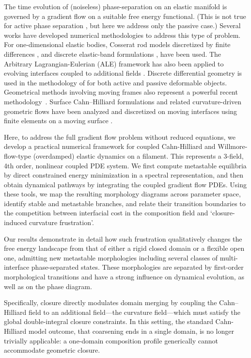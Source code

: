 \documentclass[
aip,
jcp,
reprint, 
floatfix
]{revtex4-1}
\begin{document}
The time evolution of (noiseless) phase-separation on an elastic manifold is governed by a gradient flow on a suitable free energy functional. (This is not true for active phase separation \cite{Cates_2025}, but here we address only the passive case.) Several works have developed numerical methodologies to address this type of problem. For one-dimensional elastic bodies, Cosserat rod models discretized by finite differences \cite{PyElastica}, and discrete elastic-band formulations \cite{Bergou2008discrete}, have been used. The Arbitrary Lagrangian-Eulerian (ALE) framework has also been applied to evolving interfaces coupled to additional fields \cite{membranes15040106}. Discrete differential geometry is used in the methodology of \cite{choi2024dismech} for both active and passive deformable objects. Geometrical methods involving moving frames also represent a powerful recent methodology~\cite{kikuchi2024rare,nemeth2024geometric}. Surface Cahn--Hilliard formulations and related curvature-driven geometric flows have been analyzed and discretized on moving interfaces using finite elements on a moving surface \cite{elliott2010surface, elliott2021domain}. 

Here, to address the full gradient flow problem without reduced equations, we develop a practical numerical framework for coupled Cahn-Hilliard and Willmore-flow-type\cite{willmore1993riemannian} (overdamped) elastic dynamics on a filament. This represents a 3-field, 4th order, nonlinear coupled PDE system. We first compute metastable equilibria by direct constrained energy minimization in a spectral representation, and then obtain dynamical pathways by integrating the coupled gradient flow PDEs. Using these tools, we map the resulting morphology diagrams across parameter space, identify stable and metastable branches, and relate their transition boundaries to the competition between interfacial cost in the composition field and `closure-induced curvature frustration'. 

Our results demonstrate in detail how such frustration qualitatively changes the free energy landscape from that of either a rigid closed domain or a flexible open one, admitting new metastable morphologies including several classes of multi-interface phase-separated states. These morphologies are separated by first-order morphological transitions and have a strong influence on dynamical evolution, as well as on the phase diagram.

Specifically, closure directly modulates domain merging by coupling the Cahn--Hilliard field to an additional field---the curvature field---which must satisfy the global double-integral closure constraints. In this setting, the standard Cahn-Hilliard model outcome, that coarsening ends in a single domain, is no longer trivially applicable: a one-domain composition profile generically cannot accommodate geometric closure.
\end{document}
